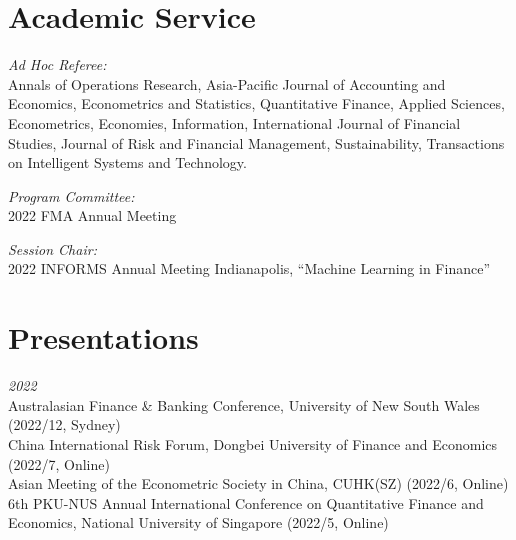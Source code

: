 \documentclass[margin]{res}
\begin{document}
\begin{resume}

\section{\sc Academic Service}

\textit{Ad Hoc Referee:}  \\
Annals of Operations Research,
Asia-Pacific Journal of Accounting and Economics,
Econometrics and Statistics, 
Quantitative Finance,
Applied Sciences,
Econometrics,
Economies, 
Information,
International Journal of Financial Studies,
Journal of Risk and Financial Management,
Sustainability,
Transactions on Intelligent Systems and Technology.

\textit{Program Committee:} \\
2022 FMA Annual Meeting

\textit{Session Chair:}  \\
2022 INFORMS Annual Meeting Indianapolis, “Machine Learning in Finance”

\vspace{5mm}

\section{\sc Presentations}

\textit{2022} \\
Australasian Finance \& Banking Conference, University of New South Wales (2022/12, Sydney) \\
China International Risk Forum, Dongbei University of Finance and Economics  (2022/7, Online) \\
Asian Meeting of the Econometric Society in China, CUHK(SZ) (2022/6, Online) \\
6th PKU-NUS Annual International Conference on Quantitative Finance and Economics, National University of Singapore (2022/5, Online) \\


\end{resume}
\end{document}
